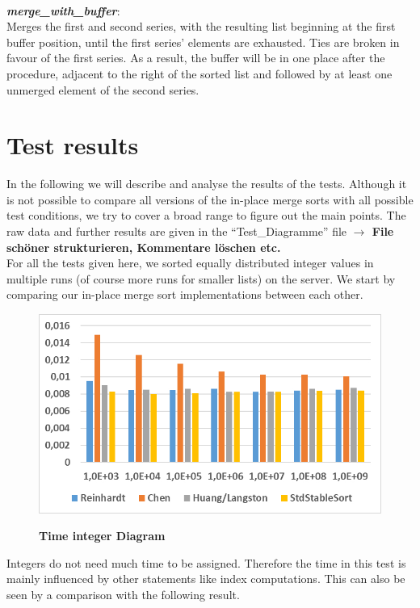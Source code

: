 \documentclass[11pt,pdftex,a4paper, twocolumn]{article}
\begin{document}
$ $ \\
\textbf{\textit{merge\_with\_buffer}}: \\
Merges the first and second series, with the resulting list beginning at the first buffer position, until the first series’ elements are exhausted. Ties are broken in favour of the first series. As a result, the buffer will be in one place after the procedure, adjacent to the right of the sorted list and followed by at least one unmerged element of the second series.

\section*{Test results}
In the following we will describe and analyse the results of the tests. Although it is not possible to compare all versions of the in-place merge sorts with all possible test conditions, we try to cover a broad range to figure out the main points. The raw data and further results are given in the “Test\_Diagramme” file \textbf{$ \rightarrow $ File schöner strukturieren, Kommentare löschen etc.} \\
For all the tests given here, we sorted equally distributed integer values in multiple runs (of course more runs for smaller lists) on the server. We start by comparing our in-place merge sort implementations between each other. \\
\begin{figure}[H]
\includegraphics[width=\linewidth]{Diagramm-Bilder/ints-time.JPG} \\
\caption{\textbf{Time integer Diagram}} \label{fig:ints-time}
\end{figure}
Integers do not need much time to be assigned. Therefore the time in this test is mainly influenced by other statements like index computations. This can also be seen by a comparison with the following result. \\
\end{document}
